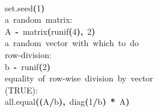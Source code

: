 \documentclass[reqno,12pt,oneside,a4paper]{report} %
\newcommand{\hlnumber}[1]{\textcolor[rgb]{0.0823529411764706,0.0784313725490196,0.709803921568627}{#1}}%
\newcommand{\hlfunctioncall}[1]{\textcolor[rgb]{1,0,0}{#1}}%
\newcommand{\hlkeyword}[1]{\textcolor[rgb]{0,0,0}{\textbf{#1}}}%
\newcommand{\hlcomment}[1]{\textcolor[rgb]{0.8,0.8,0.8}{#1}}%
\newcommand{\hlassignement}[1]{\textcolor[rgb]{0.215686274509804,0.215686274509804,0.384313725490196}{\textbf{#1}}}%
\newcommand{\hlsymbol}[1]{\textcolor[rgb]{0,0,0}{#1}}%
\newcommand{\hlprompt}[1]{\textcolor[rgb]{0,0,0}{#1}}%
\newcommand{\hlstd}[1]{\textcolor[rgb]{0,0,0}{#1}}%
\newenvironment{Houtput}{\raggedright}{%
%
}
\theoremstyle{plain}
\theoremstyle{definition}
\theoremstyle{remark}
\numberwithin{theorem}{chapter}     %
\begin{document}
\singlespacing
\begin{Houtput}
\hspace*{\fill}\\
\hlstd{}\ttfamily\noindent
\hlprompt{\usebox{\hlnormalsizeboxgreaterthan}{\ }}\hlfunctioncall{set.seed}\hlkeyword{(}\hlnumber{1}\hlkeyword{)}\mbox{}
\normalfont
\hspace*{\fill}\\
\hlstd{}\ttfamily\noindent
\hlprompt{\usebox{\hlnormalsizeboxgreaterthan}{\ }}\hlcomment{\usebox{\hlnormalsizeboxhash}{\ }a{\ }random{\ }matrix:}\mbox{}
\normalfont
\hspace*{\fill}\\
\hlstd{}\ttfamily\noindent
\hlprompt{\usebox{\hlnormalsizeboxgreaterthan}{\ }}\hlsymbol{A}{\ }\hlassignement{\usebox{\hlnormalsizeboxlessthan}-}{\ }\hlfunctioncall{matrix}\hlkeyword{(}\hlfunctioncall{runif}\hlkeyword{(}\hlnumber{4}\hlkeyword{)}\hlkeyword{,}{\ }\hlnumber{2}\hlkeyword{)}\mbox{}
\normalfont
\hspace*{\fill}\\
\hlstd{}\ttfamily\noindent
\hlprompt{\usebox{\hlnormalsizeboxgreaterthan}{\ }}\hlcomment{\usebox{\hlnormalsizeboxhash}{\ }a{\ }random{\ }vector{\ }with{\ }which{\ }to{\ }do}\mbox{}
\normalfont
\hspace*{\fill}\\
\hlstd{}\ttfamily\noindent
\hlprompt{\usebox{\hlnormalsizeboxgreaterthan}{\ }}\hlcomment{\usebox{\hlnormalsizeboxhash}{\ }{\ }{\ }row-division:}\mbox{}
\normalfont
\hspace*{\fill}\\
\hlstd{}\ttfamily\noindent
\hlprompt{\usebox{\hlnormalsizeboxgreaterthan}{\ }}\hlsymbol{b}{\ }\hlassignement{\usebox{\hlnormalsizeboxlessthan}-}{\ }\hlfunctioncall{runif}\hlkeyword{(}\hlnumber{2}\hlkeyword{)}\mbox{}
\normalfont
\hspace*{\fill}\\
\hlstd{}\ttfamily\noindent
\hlprompt{\usebox{\hlnormalsizeboxgreaterthan}{\ }}\hlcomment{\usebox{\hlnormalsizeboxhash}{\ }equality{\ }of{\ }row-wise{\ }division{\ }by{\ }vector}\mbox{}
\normalfont
\hspace*{\fill}\\
\hlstd{}\ttfamily\noindent
\hlprompt{\usebox{\hlnormalsizeboxgreaterthan}{\ }}\hlcomment{\usebox{\hlnormalsizeboxhash}{\ }{\ }{\ }(TRUE):}\mbox{}
\normalfont
\hspace*{\fill}\\
\hlstd{}\ttfamily\noindent
\hlprompt{\usebox{\hlnormalsizeboxgreaterthan}{\ }}\hlfunctioncall{all.equal}\hlkeyword{(}\hlkeyword{(}\hlsymbol{A}\hlkeyword{/}\hlsymbol{b}\hlkeyword{)}\hlkeyword{,}{\ }\hlfunctioncall{diag}\hlkeyword{(}\hlnumber{1}\hlkeyword{/}\hlsymbol{b}\hlkeyword{)}{\ }\hlkeyword{\usebox{\hlnormalsizeboxpercent}*\usebox{\hlnormalsizeboxpercent}}{\ }\hlsymbol{A}\hlkeyword{)}\mbox{}

\end{Houtput}
\end{document}
